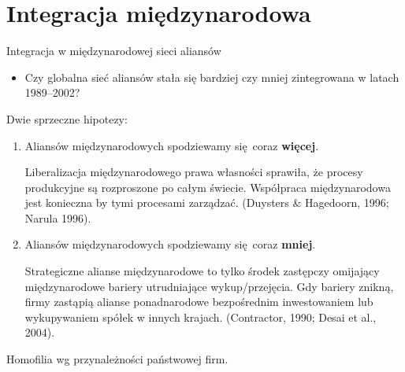 \documentclass{beamer}
\renewcommand{\emph}[1]{\textbf{#1}}
\begin{document}
\section{Integracja międzynarodowa}

\begin{frame}
	\begin{center}
		\begin{Huge}
		Integracja w międzynarodowej sieci aliansów
		\end{Huge}
	\end{center}
\end{frame}

\begin{frame}
	\begin{itemize}
		\item Czy globalna sieć aliansów stała się bardziej czy mniej zintegrowana
			w latach 1989--2002?
	\end{itemize}

	Dwie sprzeczne hipotezy:
	\begin{enumerate}
		\item Aliansów międzynarodowych spodziewamy się coraz \emph{więcej}.
			\begin{footnotesize}
				Liberalizacja międzynarodowego prawa własności sprawiła, że
				procesy produkcyjne są rozproszone po całym świecie. Współpraca
				międzynarodowa jest konieczna by tymi procesami zarządzać.
				(Duysters \& Hagedoorn, 1996; Narula 1996).
			\end{footnotesize}

		\item Aliansów międzynarodowych spodziewamy się coraz \emph{mniej}.
			\begin{footnotesize}
				Strategiczne alianse międzynarodowe to tylko środek zastępczy omijający
				międzynarodowe bariery utrudniające wykup/przejęcia.  Gdy bariery
				znikną, firmy zastąpią alianse ponadnarodowe bezpośrednim inwestowaniem lub
				wykupywaniem spółek w innych krajach. (Contractor, 1990; Desai et al., 2004).
			\end{footnotesize}
	\end{enumerate}
	Homofilia wg przynależności państwowej firm.
\end{frame}
\end{document}
